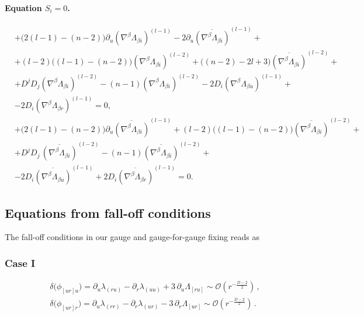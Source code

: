\documentclass[a4paper,12pt]{article}
\begin{document}
\paragraph{Equation $S_i=0$.}
\begin{align}
&+\bigl(2(l-1)-(n-2)\bigr)\partial_u(\nabla^\beta\Lambda_{\beta i})^{(l-1)}
-2\partial_u\overline{(\nabla^\beta\Lambda_{\beta i})}^{(l-1)}+
\nonumber\\
&
+(l-2)\bigl((l-1)-(n-2)\bigr)(\nabla^\beta\Lambda_{\beta i})^{(l-2)}
+\bigl((n-2)-2l+3\bigr)\overline{(\nabla^\beta\Lambda_{\beta i})}^{(l-2)}+
\nonumber\\
&
+ D^jD_j(\nabla^\beta\Lambda_{\beta i})^{(l-2)}
-(n-1)(\nabla^\beta\Lambda_{\beta i})^{(l-2)}
-2 D_i(\nabla^\beta\Lambda_{\beta u})^{(l-1)}+\\
&
-2 D_i(\nabla^\beta\Lambda_{\beta r})^{(l-1)}=0 ,
\end{align}
\begin{align}
&+\bigl(2(l-1)-(n-2)\bigr)\partial_u\overline{(\nabla^\beta\Lambda_{\beta i})}^{(l-1)}
+(l-2)\bigl((l-1)-(n-2)\bigr)\overline{(\nabla^\beta\Lambda_{\beta i})}^{(l-2)}+
\nonumber\\
&
+ D^jD_j\,\overline{(\nabla^\beta\Lambda_{\beta i})}^{(l-2)}
-(n-1)\overline{(\nabla^\beta\Lambda_{\beta i})}^{(l-2)}+
\nonumber\\
&
-2 D_i\overline{(\nabla^\beta\Lambda_{\beta u})}^{(l-1)}
+2 D_i\overline{(\nabla^\beta\Lambda_{\beta r})}^{(l-1)}=0 .
\end{align}


\subsection{Equations from fall-off conditions}\label{B2}
The fall-off conditions in our gauge and gauge-for-gauge fixing reads as
\subsubsection*{Case I}
\begin{equation}
\begin{aligned}
&\delta\!\bigl(\phi_{[u r]u}\bigr)
= \partial_u \lambda_{(r u)} - \partial_r \lambda_{(u u)} + 3\,\partial_u \Lambda_{[r u]}
\sim \mathcal{O}\!\left(r^{-\frac{D-2}{2}}\right) \, , \\
&\delta\!\bigl(\phi_{[u r]r}\bigr)
= \partial_u \lambda_{(r r)} - \partial_r \lambda_{(u r)} - 3\,\partial_r \Lambda_{[u r]}
\sim \mathcal{O}\!\left(r^{-\frac{D-2}{2}}\right) \, .
\end{aligned}
\end{equation}
\end{document}

